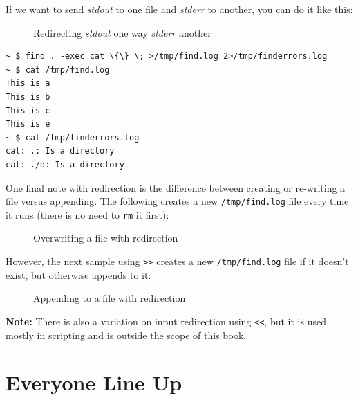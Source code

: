 \documentclass[10pt,american,]{book}
\newenvironment{Shaded}{\begin{snugshade}}{\end{snugshade}}
\newcommand{\KeywordTok}[1]{\textcolor[rgb]{0.13,0.29,0.53}{\textbf{{#1}}}}
\newcommand{\DataTypeTok}[1]{\textcolor[rgb]{0.13,0.29,0.53}{{#1}}}
\newcommand{\NormalTok}[1]{{#1}}
\numberwithin{figure}{chapter}
\DeclareRobustCommand{\drcap}[1]{\begin{figure}[H]\caption{#1}\end{figure}}
\renewcommand{\KeywordTok}[1]{{#1}}
\renewcommand{\DataTypeTok}[1]{{#1}}
\renewcommand{\NormalTok}[1]{{#1}}
\begin{document}
If we want to send \emph{stdout} to one file and \emph{stderr} to
another, you can do it like this:

\drcap{Redirecting \textit{stdout} one way \textit{stderr} another}

\begin{verbatim}
~ $ find . -exec cat \{\} \; >/tmp/find.log 2>/tmp/finderrors.log
~ $ cat /tmp/find.log
This is a
This is b
This is c
This is e
~ $ cat /tmp/finderrors.log
cat: .: Is a directory
cat: ./d: Is a directory
\end{verbatim}

One final note with redirection is the difference between creating or
re-writing a file versus appending. The following creates a new
\texttt{/tmp/find.log} file every time it runs (there is no need to
\texttt{rm} it first):

\drcap{Overwriting a file with redirection}

\begin{Shaded}
\end{Shaded}

However, the next sample using \texttt{\textgreater{}\textgreater{}}
creates a new \texttt{/tmp/find.log} file if it doesn't exist, but
otherwise appends to it:

\drcap{Appending to a file with redirection}

\begin{Shaded}
\end{Shaded}

\textbf{Note:} There is also a variation on input redirection using
\texttt{\textless{}\textless{}}, but it is used mostly in scripting and
is outside the scope of this book.

\section*{Everyone Line Up}\label{everyone-line-up}
\end{document}
